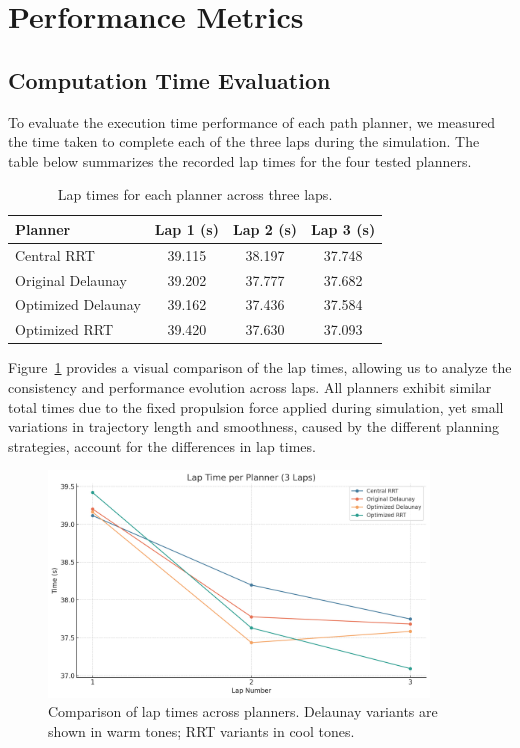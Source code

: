 \documentclass[a4paper,11pt]{report}
\begin{document}
\section{Performance Metrics}
\subsection{Computation Time Evaluation}

To evaluate the execution time performance of each path planner, we measured the time taken to complete each of the three laps during the simulation. The table below summarizes the recorded lap times for the four tested planners.

\begin{table}[H]
\centering
\begin{tabular}{lccc}
\toprule
\textbf{Planner} & \textbf{Lap 1 (s)} & \textbf{Lap 2 (s)} & \textbf{Lap 3 (s)} \\
\midrule
Central RRT & 39.115 & 38.197 & 37.748 \\
Original Delaunay & 39.202 & 37.777 & 37.682 \\
Optimized Delaunay & 39.162 & 37.436 & 37.584 \\
Optimized RRT & 39.420 & 37.630 & 37.093 \\
\bottomrule
\end{tabular}
\caption{Lap times for each planner across three laps.}
\label{tab:lap-times}
\end{table}

Figure~\ref{fig:lap-times-plot} provides a visual comparison of the lap times, allowing us to analyze the consistency and performance evolution across laps. All planners exhibit similar total times due to the fixed propulsion force applied during simulation, yet small variations in trajectory length and smoothness, caused by the different planning strategies, account for the differences in lap times.

\begin{figure}[H]
\centering
\includegraphics[width=0.9\textwidth]{Images/lap_time_table_plot_colored.png}
\caption{Comparison of lap times across planners. Delaunay variants are shown in warm tones; RRT variants in cool tones.}
\label{fig:lap-times-plot}
\end{figure}
\end{document}
